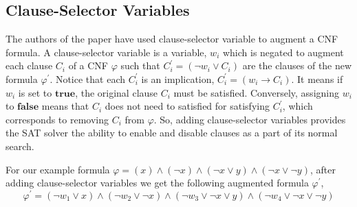 \subsection{Clause-Selector Variables}
The authors of the paper \cite{karem} have used clause-selector variable to augment a CNF formula. A clause-selector variable is a variable, $w_{i}$ which is negated to augment each clause $C_{i}$ of a CNF $\varphi$ such that $C^{\prime}_{i}=(\neg w_{i}\vee C_{i})$ are the clauses of the new formula $\varphi^{\prime}$. Notice that each $C^{\prime}_{i}$ is an implication, $C^{\prime}_{i}=(w_{i}\rightarrow C_{i})$. It means if $w_{i}$ is set to $\mathbf{true}$, the original clause $C_{i}$ must be satisfied. Conversely, assigning $w_{i}$ to $\mathbf{false}$ means that $C_{i}$ does not need to satisfied for satisfying $C_{i}^{\prime}$, which corresponds to removing $C_{i}$ from $\varphi$. So, adding clause-selector variables provides the SAT solver the ability to enable and disable clauses as a part of its normal search.
\begin{example}
	For our example formula $\varphi=(x)\wedge(\neg x)\wedge(\neg x\vee y)\wedge(\neg x \vee \neg y)$, after adding clause-selector variables we get the following augmented formula $\varphi^{\prime}$, 
	$$\varphi^{\prime}=(\neg w_{1}\vee x)\wedge(\neg w_{2}\vee \neg x)\wedge(\neg w_{3}\vee \neg x\vee y)\wedge(\neg w_{4}\vee \neg x \vee \neg y)$$
	
\end{example}
